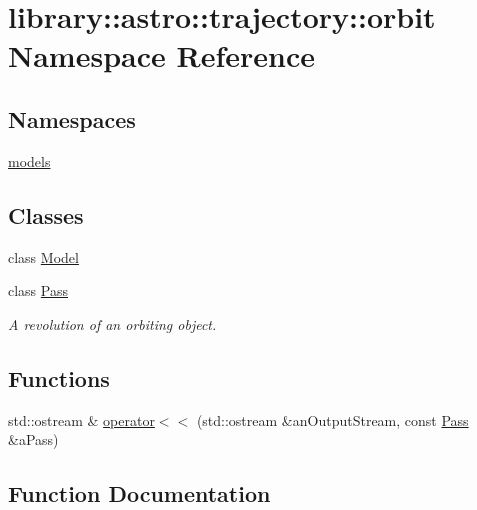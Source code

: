 \hypertarget{namespacelibrary_1_1astro_1_1trajectory_1_1orbit}{}\section{library\+:\+:astro\+:\+:trajectory\+:\+:orbit Namespace Reference}
\label{namespacelibrary_1_1astro_1_1trajectory_1_1orbit}
\subsection*{Namespaces}
\begin{DoxyCompactItemize}
\item 
 \hyperlink{namespacelibrary_1_1astro_1_1trajectory_1_1orbit_1_1models}{models}
\end{DoxyCompactItemize}
\subsection*{Classes}
\begin{DoxyCompactItemize}
\item 
class \hyperlink{classlibrary_1_1astro_1_1trajectory_1_1orbit_1_1_model}{Model}
\item 
class \hyperlink{classlibrary_1_1astro_1_1trajectory_1_1orbit_1_1_pass}{Pass}
\begin{DoxyCompactList}\small\item\em A revolution of an orbiting object. \end{DoxyCompactList}\end{DoxyCompactItemize}
\subsection*{Functions}
\begin{DoxyCompactItemize}
\item 
std\+::ostream \& \hyperlink{namespacelibrary_1_1astro_1_1trajectory_1_1orbit_a16c2c5645065e297d665c619bb261a6e}{operator$<$$<$} (std\+::ostream \&an\+Output\+Stream, const \hyperlink{classlibrary_1_1astro_1_1trajectory_1_1orbit_1_1_pass}{Pass} \&a\+Pass)
\end{DoxyCompactItemize}


\subsection{Function Documentation}
\mbox{\label{namespacelibrary_1_1astro_1_1trajectory_1_1orbit_a16c2c5645065e297d665c619bb261a6e}} 
